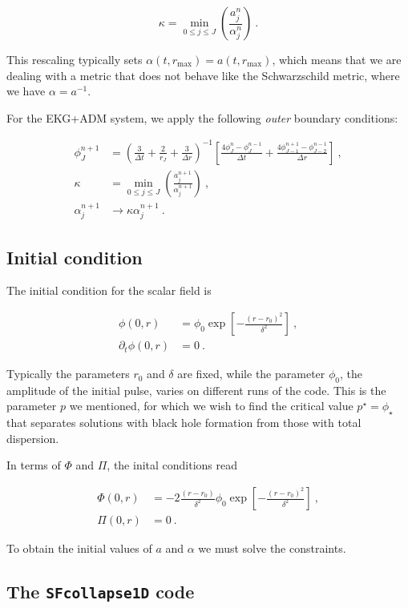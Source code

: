 \documentclass[a4paper,11pt]{article}
\renewcommand{\a}{\alpha}
\renewcommand{\d}{\delta}
\newcommand{\pd}{\partial}
\newcommand{\nn}{\nonumber}
\newcommand{\dt}{\Delta t}
\newcommand{\dr}{\Delta r}
\newcommand{\lrpar}[1]{\left( #1 \right)}
\newcommand{\lrsquare}[1]{\left[ #1 \right]}
\newcommand{\n}{\noindent}
\newcommand{\eq}[1]{
  \begin{equation}
    #1
  \end{equation}
}
\newcommand{\spl}[1]{
  \begin{split}
    #1
  \end{split}
}
\newcommand{\al}[1]{
  \begin{align}
    #1
  \end{align}
}
\renewcommand{\parbox}[2]{

  \vspace*{0.25in}
  
  \begin{tcolorbox}[title=Box #1,colback=blue!5!white,colframe=gray!75!black]
    #2
  \end{tcolorbox}

  \vspace*{0.25in}

}
\begin{document}
\eq{ \kappa = \min_{0\leq j\leq J}\lrpar{\frac{a^{n}_{j}}{\a^{n}_{j}}}\ . }

\n This rescaling typically sets $\a(t,r_{\max}) = a(t,r_{\max})$, which means that we are dealing with a metric that does not behave like the Schwarzschild metric, where we have $\a = a^{-1}$.

\parbox{5: EKG+ADM -- Outer boundary conditions}{
  For the EKG+ADM system, we apply the following \emph{outer} boundary conditions:
  \al{
    \phi^{n+1}_{J} &= \lrpar{\frac{3}{\dt} + \frac{2}{r_{J}} + \frac{3}{\dr}}^{-1}\lrsquare{\frac{4\phi^{n}_{J} - \phi^{n-1}_{J}}{\dt} + \frac{4\phi^{n+1}_{J-1} - \phi^{n-1}_{J-2}}{\dr}}\ ,\nn\\
    \kappa &= \min_{0\leq j\leq J}\lrpar{\frac{a^{n+1}_{j}}{\a^{n+1}_{j}}}\ ,\nn\\
    \a^{n+1}_{j} &\to \kappa\a^{n+1}_{j}\ .\nn
  }
}

\subsection{Initial condition}

The initial condition for the scalar field is

\eq{
  \spl{
    \phi(0,r) &= \phi_{0}\exp\lrsquare{-\frac{\lrpar{r-r_{0}}^{2}}{\d^{2}}}\ ,\\
    \pd_{t}\phi(0,r) &= 0\ .
  }
  \label{eq:initial_condition_1}
}

\n Typically the parameters $r_{0}$ and $\d$ are fixed, while the parameter $\phi_{0}$, the amplitude of the initial pulse, varies on different runs of the code. This is the parameter $p$ we mentioned, for which we wish to find the critical value $p^{\star}=\phi_{\star}$ that separates solutions with black hole formation from those with total dispersion.

In terms of $\Phi$ and $\Pi$, the inital conditions read

\eq{
  \spl{
    \Phi(0,r) &= -2\frac{\lrpar{r-r_{0}}}{\d^{2}}\phi_{0}\exp\lrsquare{-\frac{\lrpar{r-r_{0}}^{2}}{\d^{2}}}\ ,\\
    \Pi(0,r)  &= 0\ .
  }
  \label{eq:initial_condition_2}
}

\n To obtain the initial values of $a$ and $\a$ we must solve the constraints.

\subsection{The {\tt SFcollapse1D} code}
\end{document}
